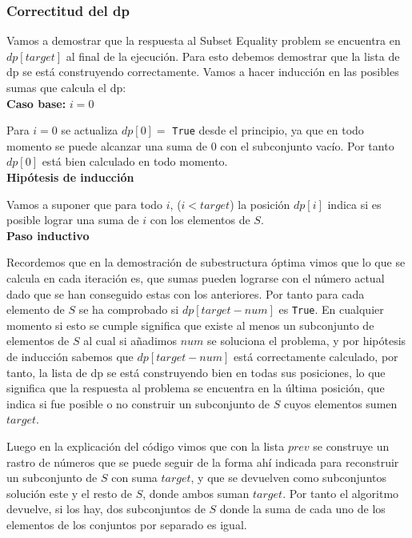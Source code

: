 \documentclass[11pt]{article}
\begin{document}
    \subsubsection{Correctitud del dp}
    Vamos a demostrar que la respuesta al Subset Equality problem se encuentra en $dp[target]$ al final de la ejecución. Para
    esto debemos demostrar que la lista de dp se está construyendo correctamente. Vamos a hacer inducción en las posibles sumas que
    calcula el dp:\\[10pt]

    \textbf{Caso base:} $i = 0$
    
    Para $i = 0$ se actualiza $dp[0] =$ \texttt{True} desde el principio, ya que en todo momento se puede alcanzar
    una suma de 0 con el subconjunto vacío. Por tanto $dp[0]$ está bien calculado en todo momento.\\[10pt]

    \textbf{Hipótesis de inducción}
    
    Vamos a suponer que para todo $i$, ($i < target$) la posición $dp[i]$ indica si es posible lograr una suma de $i$
    con los elementos de $S$.\\[10pt]

    \textbf{Paso inductivo}
    
    Recordemos que en la demostración de subestructura óptima vimos que lo que se calcula en cada iteración es, que sumas pueden
    lograrse con el número actual dado que se han conseguido estas con los anteriores. Por tanto para cada elemento de $S$ se
    ha comprobado si $dp[target - num]$ es \texttt{True}. En cualquier momento si esto se cumple significa que existe al menos un subconjunto
    de elementos de $S$ al cual si añadimos $num$ se soluciona el problema, y por hipótesis de inducción sabemos que $dp[target-num]$
    está correctamente calculado, por tanto, la lista de dp se está construyendo bien en todas sus posiciones, lo que significa
    que la respuesta al problema se encuentra en la última posición, que indica si fue posible o no construir un subconjunto de $S$
    cuyos elementos sumen $target$.

    Luego en la explicación del código vimos que con la lista $prev$ se construye un rastro de números que se puede seguir de la forma ahí indicada
    para reconstruir un subconjunto de $S$ con suma $target$, y que se devuelven como subconjuntos solución este y el resto de $S$,
    donde ambos suman $target$. Por tanto el algoritmo devuelve, si los hay, dos subconjuntos de $S$ donde la suma de cada uno
    de los elementos de los conjuntos por separado es igual.
\end{document}
